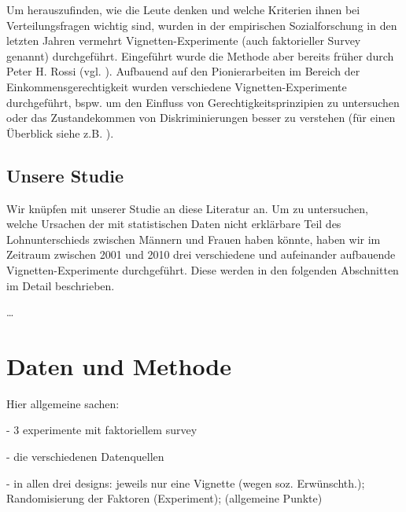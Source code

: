 \documentclass[a4paper,12pt]{article}
\renewcommand{\baselinestretch}{1.1}
\newif\ifcomments
\newcommand{\comment}[1]{%
    \ifcomments\marginpar{\renewcommand{\baselinestretch}{1}\tiny\hspace*{-1.1em}\colorbox{gray!20}%
    {\textcolor{red}{\parbox[t]{.9in}{\raggedright #1}}}}\fi}
\begin{document}
Um herauszufinden, wie die Leute denken und welche Kriterien ihnen bei
Verteilungsfragen wichtig sind, wurden in der empirischen Sozialforschung in
den letzten Jahren vermehrt Vignetten-Experimente (auch faktorieller Survey
genannt) durchgeführt. Eingeführt wurde die Methode aber bereits früher durch
Peter H. Rossi (vgl. \citealp{Rossi-1979,Rossi-Nock-1982}). Aufbauend auf den
Pionierarbeiten im Bereich der Einkommensgerechtigkeit
\citep{Jasso-1980,Jasso-Rossi-1977,Jasso-Webster-1997} wurden verschiedene
Vignetten-Experimente durchgeführt, bspw. um den Einfluss von
Gerechtigkeitsprinzipien zu untersuchen oder das Zustandekommen von
Diskriminierungen besser zu verstehen (für einen Überblick siehe z.B.
\citealp{Auspurg-etal-2017,Gatskova-2015}).

\comment{Auspurg et al: gender-specific referents vs. gender status beliefs: gsr: Frauen vergleichen sich mit anderen Frauen und merken drum gar nicht, dass sie weniger kriegen als Männer. Konsequenterweise würden sie auch Männer tiefer bewerten als das die Männer selbst tun. Es dürfte also keinen just pay gap geben, nur unterschiedliche Bewertung je nach Geschlecht der Befragten.}

\subsection{Unsere Studie}

Wir knüpfen mit unserer Studie an diese Literatur an. Um zu untersuchen, welche
Ursachen der mit statistischen Daten nicht erklärbare Teil des Lohnunterschieds
zwischen Männern und Frauen haben könnte, haben wir im Zeitraum zwischen 2001
und 2010 drei verschiedene und aufeinander aufbauende Vignetten-Experimente
durchgeführt. Diese werden in den folgenden Abschnitten im Detail beschrieben.


\dots
\comment{hier z.b. auf Auspurg et al. 2017 aufbauen}


\section{Daten und Methode}

Hier allgemeine sachen: 

- 3 experimente mit faktoriellem survey

- die verschiedenen Datenquellen

- in allen drei designs: jeweils nur eine Vignette (wegen soz. Erwünschth.); Randomisierung der Faktoren (Experiment); (allgemeine Punkte)
\end{document}
